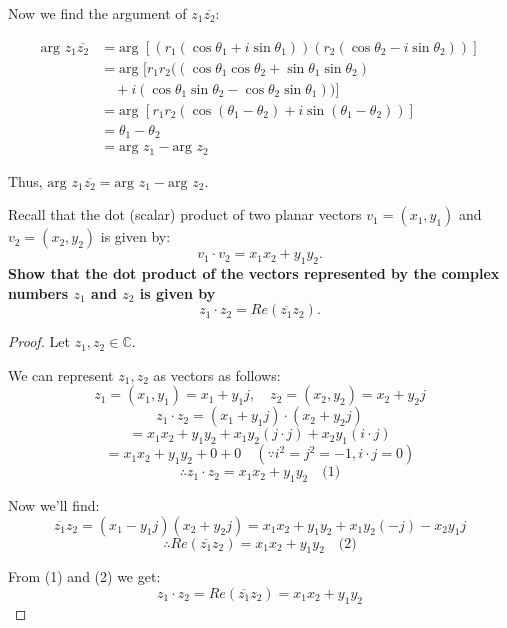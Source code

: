 \documentclass[
	12pt, %
	fleqn, %
	a4paper, %
]{LegrandOrangeBook}
\begin{document}
Now we find the argument of $z_1 \overline{z_2}$:

\begin{align*}
    \text{arg } z_1 \overline{z_2} &= \text{arg }[(r_1(\cos \theta_1 + i \sin \theta_1))(r_2(\cos \theta_2 - i \sin \theta_2))] \\
    &= \text{arg }[r_1r_2((\cos \theta_1 \cos \theta_2 + \sin \theta_1 \sin \theta_2) \\
    &\quad + i(\cos \theta_1 \sin \theta_2 - \cos \theta_2 \sin \theta_1))] \\
    &= \text{arg }[r_1r_2(\cos(\theta_1 - \theta_2) + i \sin(\theta_1 - \theta_2))] \\
    &= \theta_1 - \theta_2 \\
    &= \text{arg } z_1 - \text{arg } z_2
\end{align*}

Thus, $\text{arg } z_1 \overline{z_2} = \text{arg } z_1 - \text{arg } z_2$.

\begin{exercise}
    Recall that the dot (scalar) product of two planar vectors $v_1 = (x_1, y_1)$ and $v_2 = (x_2, y_2)$ is given by:
    \[ v_1 \cdot v_2 = x_1x_2 + y_1y_2. \]
\textbf{Show that the dot product of the vectors represented by the complex numbers $z_1$ and $z_2$ is given by}
\[ z_1 \cdot z_2 = Re(\overline{z_1}z_2). \]
\end{exercise}
\begin{proof}
    Let $z_1, z_2 \in \mathbb{C}$.

We can represent $z_1, z_2$ as vectors as follows:
\[ z_1 = (x_1, y_1) = x_1 + y_1j, \quad z_2 = (x_2, y_2) = x_2 + y_2j \]
\[ z_1 \cdot z_2 = (x_1 + y_1j) \cdot (x_2 + y_2j) \]
\[ = x_1x_2 + y_1y_2 + x_1y_2(j \cdot j) + x_2y_1(i \cdot j) \]
\[ = x_1x_2 + y_1y_2 + 0 + 0 \quad (\because i^2 = j^2 = -1, i \cdot j = 0) \]
\[ \therefore z_1 \cdot z_2 = x_1x_2 + y_1y_2 \quad \text{(1)} \]

Now we'll find:
\[ \overline{z_1}z_2 = (x_1 - y_1j)(x_2 + y_2j) = x_1x_2 + y_1y_2 + x_1y_2(-j) - x_2y_1j \]
\[ \therefore Re(\overline{z_1}z_2) = x_1x_2 + y_1y_2 \quad \text{(2)} \]

From (1) and (2) we get:
\[ z_1 \cdot z_2 = Re(\overline{z_1}z_2) = x_1x_2 + y_1y_2 \]
\end{proof}
\end{document}

